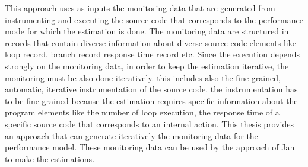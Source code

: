 This approach uses as inputs the monitoring data that are generated from instrumenting and executing the source code that corresponds to the performance mode for which the estimation is done. The monitoring data are structured in records that contain diverse information about diverse source code elements like loop record, branch record response time record etc. Since the execution depends strongly on the monitoring data, in order to keep the estimation iterative, the monitoring must be also done iteratively. this includes also the fine-grained, automatic, iterative instrumentation of the source code. the instrumentation has to be fine-grained because the estimation requires specific information about the program elements like the number of loop execution, the response time of a specific source code that corresponds to an internal action. This thesis provides an approach that can generate iteratively the monitoring data for the performance model. These monitoring data can be used by the approach of Jan to make the estimations.







